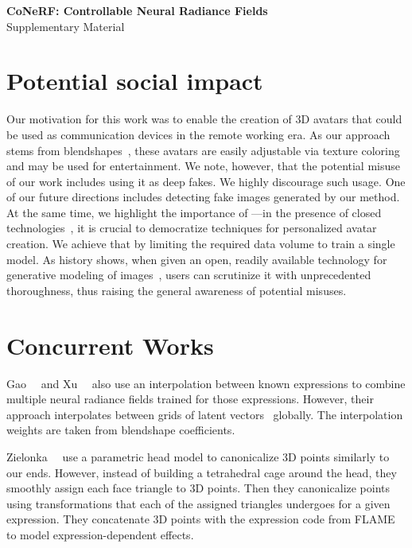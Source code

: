 {
\vspace{2.0em}
\centering
\Large
\textbf{CoNeRF: Controllable Neural Radiance Fields} \\
\vspace{0.5em}
 Supplementary Material \\ \vspace{1.0em} }

 \section{Potential social impact} Our motivation for this work was to enable
 the creation of 3D avatars that could be used as communication devices in the
 remote working era.
  As our approach stems from blendshapes~\cite{lewis2014practice}, these
  avatars are easily adjustable via texture coloring and may be used for
  entertainment.
  We note, however, that the potential misuse of our work includes using it as
  deep fakes.
  We highly discourage such usage.
  One of our future directions includes detecting fake images generated by our
  method.
  At the same time, we highlight the importance of \blendfields---in the
  presence of closed technologies~\cite{ma2021pixel,cao2022authentic}, it is
  crucial to democratize techniques for personalized avatar creation.
  We achieve that by limiting the required data volume to train a single
  model.
  As history shows, when given an open, readily available technology for
  generative modeling of images~\cite{rombach2022high}, users can scrutinize
  it with unprecedented thoroughness, thus raising the general awareness of
  potential misuses.

\section{Concurrent Works}
  Gao~\etal~\cite{gao2022reconstructing} and Xu~\etal~\cite{xu2023avatarmav}
  also use an interpolation between known expressions to combine multiple
  neural radiance fields trained for those expressions.
  However, their approach interpolates between grids of latent
  vectors~\cite{mueller2022instant} globally.
  The interpolation weights are taken from blendshape coefficients.

  Zielonka~\etal~\cite{zielonka2022instant} use a parametric head model to
  canonicalize 3D points similarly to our ends.
  However, instead of building a tetrahedral cage around the head, they
  smoothly assign each face triangle to 3D points.
  Then they canonicalize points using transformations that each of the
  assigned triangles undergoes for a given expression.
  They concatenate 3D points with the expression code from
  FLAME~\cite{li2017flame} to model expression-dependent effects.

